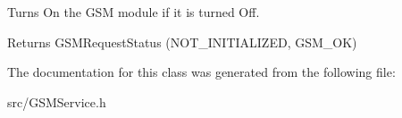 Turns On the G\+SM module if it is turned Off. 

\begin{DoxyReturn}{Returns}
G\+S\+M\+Request\+Status (N\+O\+T\+\_\+\+I\+N\+I\+T\+I\+A\+L\+I\+Z\+ED, G\+S\+M\+\_\+\+OK) 
\end{DoxyReturn}


The documentation for this class was generated from the following file\+:\begin{DoxyCompactItemize}
\item 
src/G\+S\+M\+Service.\+h\end{DoxyCompactItemize}
